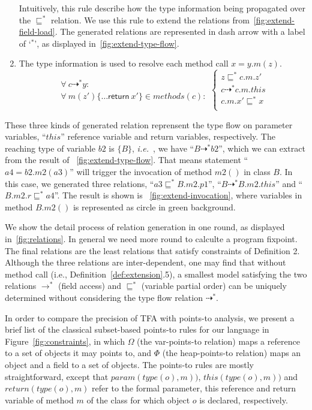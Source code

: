 \documentclass{fac}
\newcommand\ie{\textit{i.e.\ }}
\newcommand{\keyword}[1]{\mathsf{#1}}
\newcommand{\kw}[1]{\keyword{#1}}
\newcommand{\VPT}{\Omega}
\newcommand{\HPT}{\Phi}
\newcommand{\less}{\sqsubseteq}
\newcommand{\tflow}{\dashrightarrow}
\begin{document}
\begin{enumerate}
  Intuitively, this rule describe how the type information being propagated over the $\less^*$ relation. We use this rule to extend the relations from~\ref{fig:extend-field-load}. The generated relations are represented in dash arrow with a label of `$^*$', as displayed in~\ref{fig:extend-type-flow}.
  
  \item The type information is used to resolve each method call $x = y.m(z)$.  
  \begin{equation*}
  \left.\begin{array}{l}\forall\ c\tflow^* y:\\ \forall\ m(z')\{\dots \kw{return}\ x'\}\in methods(c):\end{array}\right.\left\{\begin{array}{l}
        z\less^* c.m.z'\\
        c\tflow^* c.m.this\\
        c.m.x'\less^* x \\
        \end{array}\right.
  \end{equation*}
\end{enumerate}

These three kinds of generated relation reprensent the type flow on parameter variables, ``$this$'' reference variable and return variables, respectively.
The reaching type of variable $b2$ is $\{B\}$, \ie, we have ``$B \tflow^* b2$'', which we can extract from the result of ~\ref{fig:extend-type-flow}. That means statement ``$a4=b2.m2(a3)$'' will trigger the invocation of method $m2()$ in class $B$. In this case, we generated three relations, ``$a3 \less^* B.m2.p1$'', ``$B \tflow^* B.m2.this$'' and ``$B.m2.r \less^* a4$''. The result is shown is ~\ref{fig:extend-invocation}, where variables in method $B.m2()$ is represented as circle in green background.

We show the detail process of relation generation in one round, as displayed in~\ref{fig:relations}. In general we need more round to calculte a program fixpoint. The final relations are the least relations that satisfy constraints of Definition 2. Although the three relations are inter-dependent, one may find that without method call (i.e., Definition~\ref{def:extension}.5), a smallest model satisfying the two relations $\rightarrow^*$ (field access) and $\less^*$ (variable partial order) can be uniquely determined without considering the type flow relation $\tflow^*$.

In order to compare the precision of TFA with points-to analysis, we present a brief list of the classical subset-based points-to rules for our language in Figure~\ref{fig:constraints}, in which $\VPT$ (the var-points-to relation) maps a reference to a set of objects it may points to, and $\HPT$ (the heap-points-to relation) maps an object and a field to a set of objects. The points-to rules are mostly straightforward, except that %
$param(type(o),m))$, $this(type(o),m))$ and $return(type(o),m)$ refer to the formal parameter, \textsf{this} reference and \textsf{return} variable of method $m$ of the class for which object $o$ is declared, respectively.
\end{document}
